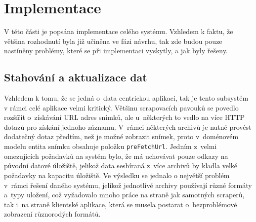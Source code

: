 \chapter{Implementace} 
\label{chap:implementation}
V této části je popsána implementace celého systému. Vzhledem k faktu, že většina rozhodnutí byla již učiněna ve fázi návrhu, tak zde budou pouze nastíněny problémy, které se při implementaci vyskytly, a jak byly řešeny. 

\section{Stahování a aktualizace dat}
Vzhledem k tomu, že se jedná o~data centrickou aplikaci, tak je tento subsystém v rámci celé aplikace velmi kritický. Většinu scrapovacích pavouků se povedlo rozšířit o~získávání URL adres snímků, ale u~některých to vedlo na více HTTP dotazů pro získání jednoho záznamu. V~rámci některých archivů je nutné provést dodatečný dotaz předtím, než je možné zobrazit snímek, proto v~doménovém modelu entita snímku obsahuje položku \texttt{preFetchUrl}. Jedním z~velmi omezujících požadavků na systém bylo, že má uchovávat pouze odkazy na původní datové úložiště, jelikož data sesbíraná z~více archivů by kladla velké požadavky na kapacitu úložiště. Ve výsledku se jednalo o největší problém v~rámci řešení daného systému, jelikož jednotlivé archivy používají různé formáty a~typy uložení, což vyžadovalo mnoho práce na straně jak samotných scraperů, tak i~na straně klientské aplikace, která se musela postarat o~bezproblémové zobrazení různorodých formátů.

